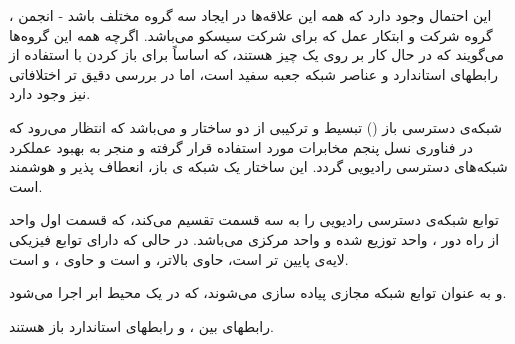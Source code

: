 این احتمال وجود دارد که همه این علاقه‌ها در ایجاد سه گروه مختلف باشد -
 انجمن 
، گروه
  شرکت 
   و ابتکار عمل
که برای شرکت سیسکو می‌باشد.
اگرچه همه این گروه‌ها می‌گویند که در حال کار بر روی یک چیز هستند، که اساساً برای باز کردن  با استفاده از رابطهای استاندارد و عناصر شبکه جعبه سفید است، اما در بررسی دقیق تر اختلافاتی نیز وجود دارد.

شبکه‌ی دسترسی باز 
()
تبسیط و ترکیبی از دو ساختار   و  می‌باشد که انتظار می‌رود که در فناوری نسل پنجم مخابرات مورد استفاده قرار گرفته و منجر به بهبود عملکرد شبکه‌های دسترسی رادیویی  گردد. 
این ساختار یک شبکه ی باز، انعطاف پذیر و هوشمند است.


توابع
 شبکه‌ی دسترسی رادیویی 
 را به سه قسمت تقسیم می‌کند،
  که قسمت اول واحد از راه دور
   
، واحد توزیع شده
    
  و واحد مرکزی 
     
   می‌باشد.
   در حالی که  دارای توابع فیزیکی   لایه‌ی پایین تر است،
     حاوی  بالاتر، 
    و
      است     
    و 
     حاوی
     ،
      و 
      است.
      
و
به عنوان توابع شبکه مجازی  پیاده سازی می‌شوند،
که در یک محیط ابر اجرا می‌شود.

رابطهای بین ،  و  رابطهای استاندارد باز هستند.
